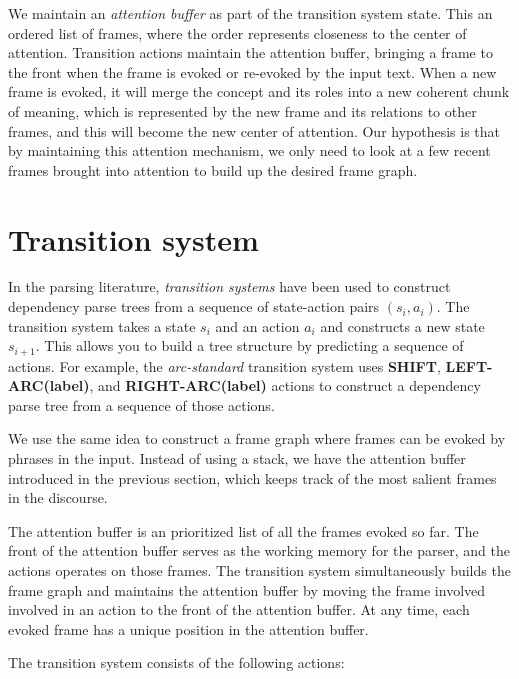 \documentclass[11pt,a4paper]{article}
\begin{document}
We maintain an \emph{attention buffer} as part of the transition system state.
This an ordered list of frames, where the order represents closeness to the
center of attention. Transition actions maintain the attention buffer, bringing
a frame to the front when the frame is evoked or re-evoked by the input text.
When a new frame is evoked, it will merge the concept and its roles into a new
coherent chunk of meaning, which is represented by the new frame and its
relations to other frames, and this will become the new center of attention.
Our hypothesis is that by maintaining this attention mechanism, we only need to
look at a few recent frames brought into attention to build up the desired
frame graph.

\section{Transition system}
\label{sec:ts}

In the parsing literature, \emph{transition systems} have been
used to construct dependency parse trees from a sequence of state-action pairs
$(s_i,a_i)$. The transition system takes a state $s_i$ and an action $a_i$ and
constructs a new state $s_{i+1}$. This allows you to build a tree structure by
predicting a sequence of actions. For example, the \emph{arc-standard}
transition system \cite{nivre2006} uses {\bf SHIFT}, {\bf LEFT-ARC(label)}, and
{\bf RIGHT-ARC(label)} actions to construct a dependency parse tree from a
sequence of those actions.

We use the same idea to construct a frame graph where frames can be
evoked by phrases in the input. Instead of using a stack, we have the attention
buffer introduced in the previous section, which keeps track of the most salient
frames in the discourse.

The attention buffer is an prioritized list of all the
frames evoked so far. The front of the attention buffer serves as the working
memory for the parser, and the actions operates on those frames. The transition
system simultaneously builds the frame graph and maintains the attention buffer
by moving the frame involved involved in an action to the front of the attention
buffer. At any time, each evoked frame has a unique position in the attention
buffer.

The transition system consists of the following actions:
\end{document}
